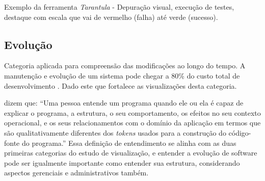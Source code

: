 Exemplo da ferramenta \textit{Tarantula} \cite{jones2002visualization} -
Depuração visual, execução de testes, destaque com escala que vai de vermelho
(falha) até verde (sucesso).

\subsection{Evolução}

Categoria aplicada para compreensão das modificações ao longo do tempo. A
manutenção e evolução de um sistema pode chegar a 80\% do custo total de
desenvolvimento \cite{pfleeger2005analyzing}. Dado este que fortalece as
visualizações desta categoria.

 dizem que: ``Uma pessoa entende um programa
quando ele ou ela é capaz de explicar o programa, a estrutura, o seu
comportamento, os efeitos no seu contexto operacional, e os seus relacionamentos
com o domínio da aplicação em termos que são qualitativamente diferentes dos
\textit{tokens} usados para a construção do código-fonte do programa.'' Essa
definição de entendimento se alinha com as duas primeiras categorias do estudo
de visualização, e entender a evolução de software pode ser igualmente
importante como entender sua estrutura, considerando aspectos gerenciais e
administrativos também.
